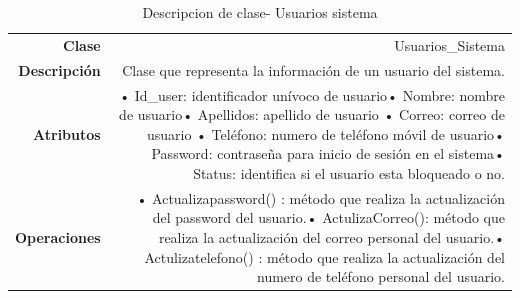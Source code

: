  \begin{table}[H]
 	\centering
 	\caption{Descripcion de clase- Usuarios sistema}
 	\begin{tabular}{|r|r|}
 		\toprule
 		\rowcolor[rgb]{ .125,  .216,  .392} \multicolumn{2}{|p{34.215em}|}{\textcolor[rgb]{ 1,  1,  1}{\textbf{Clase Usuarios\_sistema}}} \\
 		\midrule
 		\multicolumn{1}{|p{6.145em}|}{\textbf{Clase}} & \multicolumn{1}{p{28.07em}|}{Usuarios\_Sistema} \\
 		\midrule
 		\multicolumn{1}{|p{6.145em}|}{\textbf{Descripción}} & \multicolumn{1}{p{28.07em}|}{Clase que representa la información de un usuario del sistema.} \\
 		\midrule
 		\multicolumn{1}{|p{6.145em}|}{\textbf{Atributos }} & \multicolumn{1}{p{28.07em}|}{•	Id\_user: identificador unívoco de usuario\newline{}•	Nombre: nombre de usuario\newline{}•	Apellidos: apellido de usuario \newline{}•	Correo: correo de usuario \newline{}•	Teléfono: numero de teléfono móvil de usuario\newline{}•	Password: contraseña para inicio de sesión en el sistema\newline{}•	Status: identifica si el usuario esta bloqueado o no. } \\
 		\midrule
 		\multicolumn{1}{|p{6.145em}|}{\textbf{Operaciones}} & \multicolumn{1}{p{28.07em}|}{•	Actualizapassword() :  método que realiza la actualización del password del usuario.\newline{}•	ActulizaCorreo(): método que realiza la actualización del correo personal del usuario.\newline{}•	Actulizatelefono() : método que realiza la actualización del numero de teléfono personal del usuario.} \\
 		\bottomrule
 	\end{tabular}%
 	\label{tab:CLAS1}%
 \end{table}%
 
